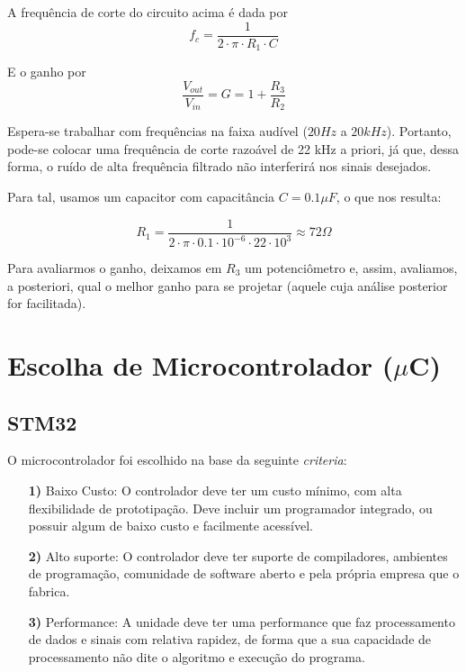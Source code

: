 \documentclass[11pt,a4paper]{report}
\begin{document}
	A frequência de corte do circuito acima é dada por \newline
	\begin{equation}
	f_c = \frac{1}{2\cdot\pi\cdot{R_1}\cdot{C}}
	\end{equation}
	
	
	E o ganho por \newline
	\begin{equation}
	\frac{V_{out}}{V_{in}} = G = 1 + \frac{R_3}{R_2}
	\end{equation}
	
	
	Espera-se trabalhar com frequências na faixa audível ($20 Hz$ a $20 kHz$). Portanto, pode-se colocar uma frequência de corte razoável de 22 kHz a priori, já que, dessa forma, o ruído de alta frequência filtrado não interferirá nos sinais desejados.
	
	
	Para tal, usamos um capacitor com capacitância $C = 0.1\mu{F}$, o que nos resulta:
	
	\begin{equation}
	R_1 = \frac{1}{2\cdot{\pi}\cdot{0.1}\cdot{10^{-6}}\cdot{22}\cdot{10^3}} \approx 72\Omega 
	\end{equation}
	
	Para avaliarmos o ganho, deixamos em $R_3$ um potenciômetro e, assim, avaliamos, a posteriori, qual o melhor ganho para se projetar (aquele cuja análise posterior for facilitada).


\section{Escolha de Microcontrolador ($\mu$C)}
	\subsection{STM32}
	O microcontrolador foi escolhido na base da seguinte {\it criteria}:
	
	\begin{itemize}
		\item[{\bf 1)}]Baixo Custo: O controlador deve ter um custo mínimo, com alta flexibilidade de prototipação. Deve incluir um programador integrado, ou possuir algum de baixo custo e facilmente acessível.
		
		\item[{\bf 2)}] Alto suporte: O controlador deve ter suporte de compiladores, ambientes de programação, comunidade de software aberto e pela própria empresa que o fabrica.
		
		\item[{\bf 3)}] Performance: A unidade deve ter uma performance que faz processamento de dados e sinais com relativa rapidez, de forma que a sua capacidade de processamento não dite o algoritmo e execução do programa.
	
	\end{itemize}
\end{document}
